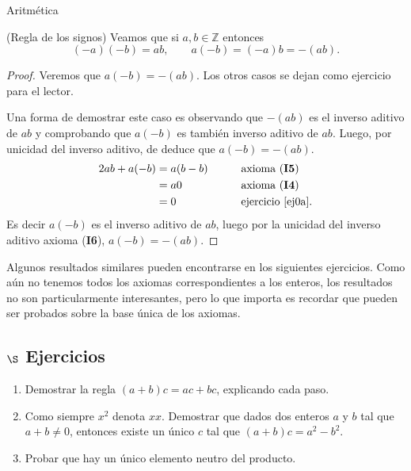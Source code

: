 \begin{section}{Aritmética}
\begin{ejemplo*} (Regla de los signos) Veamos que  si $a,b \in \mathbb Z$ entonces
$$
(-a)(-b) = ab ,\qquad a(-b) = (-a)b = -(ab).
$$
\end{ejemplo*}
\begin{proof}
Veremos que  $a(-b) = -(ab)$. Los otros casos se dejan como ejercicio para el lector.

Una forma de demostrar este caso es  observando que $-(ab)$ es el inverso aditivo de $ab$ y comprobando que $a(-b)$ es también inverso aditivo de $ab$. Luego, por unicidad del inverso aditivo, de deduce que $a(-b) = -(ab)$. 
\begin{alignat*}2
ab + a(-b) &=a(b-b) &\qquad &\text{axioma (\textbf{I5})} \\
&=a0 &\qquad &\text{axioma (\textbf{I4})}\\
&= 0 &\qquad &\text{ejercicio \ref{ej0a}}.
\end{alignat*}
Es decir $a(-b)$ es el inverso aditivo de $ab$, luego por la unicidad del inverso aditivo axioma (\textbf{I6}), $a(-b)=-(ab)$.
\end{proof}


Algunos resultados similares pueden encontrarse en los siguientes ejercicios. Como aún no tenemos todos los axiomas correspondientes a los enteros, los resultados no son particularmente interesantes, pero lo que importa es recordar que pueden ser probados sobre la base única de los axiomas.

\subsection*{$\S$ Ejercicios}

\begin{enumerate}
\item Demostrar la regla $(a+b)c=ac+bc$, explicando cada paso.

\item Como siempre $x^2$ denota $xx$. Demostrar que dados dos enteros $a$ y $b$ tal que $a+b \not=0$, entonces existe un único $c$ tal que $(a+b)c=
a^2 - b^2$.

\item \label{ej-elem-neutro-prod}Probar que hay un único elemento neutro del producto.


\end{enumerate}
\end{section}
